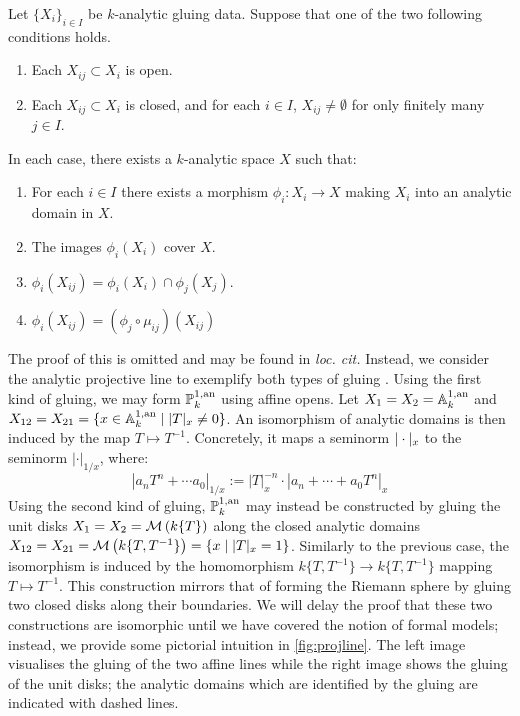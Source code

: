 \begin{theorem} \label{gluing} \parencite[Prop. 1.3.3]{berk93}
    Let $\{X_i\}_{i \in I}$ be $k$-analytic gluing data. Suppose that one of the two following conditions holds.
    \begin{enumerate}
        \item Each $X_{ij} \subset X_i$ is open.
        \item Each $X_{ij} \subset X_i$ is closed, and for each $i \in I$, $X_{ij} \neq \emptyset$ for only finitely many $j \in I$.
    \end{enumerate}
    In each case, there exists a $k$-analytic space $X$ such that:
    \begin{enumerate}
        \item For each $i \in I$ there exists a morphism $\phi_i: X_i \to X$ making $X_i$ into an analytic domain in $X$.
        \item The images $\phi_i(X_i)$ cover $X$.
        \item $\phi_i(X_{ij}) = \phi_i(X_i) \cap \phi_j(X_j)$.
        \item $\phi_i(X_{ij}) = (\phi_j \circ \mu_{ij})(X_{ij})$
    \end{enumerate}
\end{theorem}

The proof of this is omitted and may be found in \textit{loc. cit.} Instead, we consider the analytic projective line to exemplify both types of gluing \parencite[Exercise 4.1.4.2]{temk}. 
Using the first kind of gluing, we may form $\mathbb{P}^{1, \text{an}}_{k}$ using affine opens. Let $X_1 = X_2 = \mathbb{A}^{1, \text{an}}_{k}$ and $X_{12} = X_{21} = {\{ x \in \mathbb{A}^{1, \text{an}}_{k} \; | \; |T|_x \neq 0 \}}$. An isomorphism of analytic domains is then induced by the map $T \mapsto T^{-1}$. Concretely, it maps a seminorm $|\cdot|_x$ to the seminorm $|\cdot|_{1/x}$, where:
\[
    |a_nT^n + \cdots a_0|_{1/x} := |T|_{x}^{-n} \cdot |a_n + \cdots + a_0T^n|_x
\]
Using the second kind of gluing, $\mathbb{P}^{1, \text{an}}_{k}$ may instead be constructed by gluing the unit disks $X_1 = X_2 = \mathcal{M}\left(k\{T\}\right)$ along the closed analytic domains $X_{12} = X_{21} = {\mathcal{M}\left(k\{T, T^{-1}\}\right)} = \{ x \; | \; |T|_x = 1 \}$. 
Similarly to the previous case, the isomorphism is induced by the homomorphism $k\{T, T^{-1}\} \to k\{T, T^{-1}\}$ mapping $T \mapsto T^{-1}$. 
This construction mirrors that of forming the Riemann sphere by gluing two closed disks along their boundaries. We will delay the proof that these two constructions are isomorphic until we have covered the notion of formal models; instead, we provide some pictorial intuition in \cref{fig:projline}. 
The left image visualises the gluing of the two affine lines while the right image shows the gluing of the unit disks; the analytic domains which are identified by the gluing are indicated with dashed lines.

